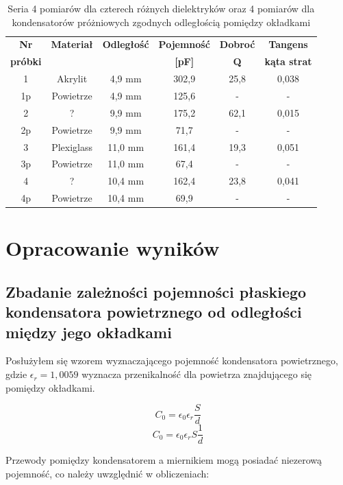 \documentclass[polish, a4paper]{article}
\begin{document}
\begin{table}[H]
    \centering
    \captionsetup{justification=centering}
    \begin{tabular}{|c|c|c|c|c|c|}
    \hline
        \textbf{Nr} & \textbf{Materiał} & \textbf{Odległość} & \textbf{Pojemność} & \textbf{Dobroć} & \textbf{Tangens} \\ 
        \textbf{próbki}& & & \textbf{[pF]} & \textbf{Q} & \textbf{kąta strat}
        \\ \hline
        1 & Akrylit & 4,9 mm & 302,9 & 25,8 & 0,038 \\ 
        1p & Powietrze & 4,9 mm & 125,6 & - & - \\ \hline
        2 & ? & 9,9 mm & 175,2 & 62,1 & 0,015 \\ 
        2p & Powietrze & 9,9 mm & 71,7 & - & - \\ \hline
        3 & Plexiglass & 11,0 mm & 161,4 & 19,3 & 0,051 \\ 
        3p & Powietrze & 11,0 mm & 67,4 & - & - \\ \hline
        4 & ? & 10,4 mm & 162,4 & 23,8 & 0,041 \\ 
        4p & Powietrze & 10,4 mm & 69,9 & - & - \\ \hline
    \end{tabular}
    \caption{Seria 4 pomiarów dla czterech różnych dielektryków oraz 4 pomiarów dla kondensatorów próżniowych zgodnych odległością pomiędzy okładkami}
\end{table}
\section{Opracowanie wyników}
\subsection{Zbadanie zależności pojemności płaskiego kondensatora powietrznego od odległości między jego okładkami}
Posłużyłem się wzorem wyznaczającego pojemność kondensatora powietrznego, gdzie $\epsilon_r = 1,0059$ wyznacza przenikalność dla powietrza znajdującego się pomiędzy okładkami.

\begin{equation}
C_0 = \epsilon_0 \epsilon_r \frac{S}{d}
\end{equation}
\begin{equation}
C_0 = \epsilon_0 \epsilon_r S \frac{1}{d}
\end{equation}

Przewody pomiędzy kondensatorem a miernikiem mogą posiadać niezerową pojemność, co należy uwzględnić w obliczeniach:
\end{document}
